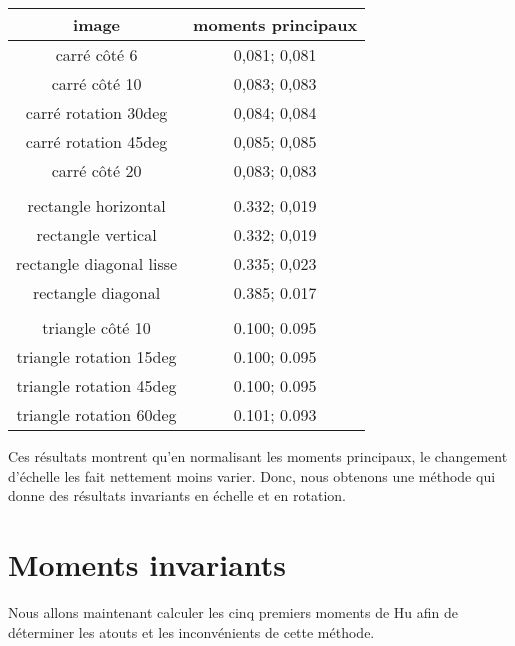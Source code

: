 \documentclass{article}
\begin{document}
   \begin{center}
    \begin{tabular}{|c|c|}
      \hline
      \textbf{image} & \textbf{moments principaux} \\
      \hline
      carré côté 6 & 0,081; 0,081 \\
      \hline
      carré côté 10 & 0,083; 0,083 \\
      \hline
      carré rotation 30deg & 0,084; 0,084 \\
      \hline
      carré rotation 45deg & 0,085; 0,085 \\
      \hline
      carré côté 20 & 0,083; 0,083 \\
      \hline
       & \\
      \hline
      rectangle horizontal & 0.332; 0,019 \\
      \hline
      rectangle vertical & 0.332; 0,019 \\
      \hline
      rectangle diagonal lisse & 0.335; 0,023 \\
      \hline
      rectangle diagonal & 0.385; 0.017 \\
      \hline
       & \\
      \hline
      triangle côté 10 & 0.100; 0.095\\
      \hline
      triangle rotation 15deg & 0.100; 0.095\\
      \hline
      triangle rotation 45deg & 0.100; 0.095\\
      \hline
      triangle rotation 60deg & 0.101; 0.093\\
      \hline
    \end{tabular}
  \end{center}
  
  Ces résultats montrent qu'en normalisant les moments principaux, le changement d'échelle les 
  fait nettement moins varier. Donc, nous obtenons une méthode qui donne des résultats invariants 
  en échelle et en rotation.\\
  
   \newpage
  
  \section{Moments invariants}
  Nous allons maintenant calculer les cinq premiers moments de Hu afin de déterminer les atouts
  et les inconvénients de cette méthode.
  
\end{document}
